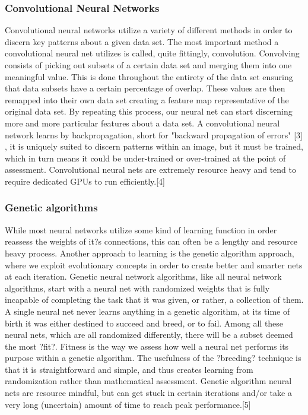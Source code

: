 \documentclass[article, onecolumn, draftclsnofoot,10pt, compsoc]{IEEEtran}
\begin{document}
\subsubsection{Convolutional Neural Networks}
Convolutional neural networks utilize a variety of different methods in order to  discern key patterns about a given data set. The most important method a convolutional neural net utilizes is called, quite fittingly, convolution. Convolving consists of picking out subsets of a certain data set and merging them into one meaningful value. This is done throughout the entirety of the data set ensuring that data subsets have a certain percentage of overlap. These values are then remapped into their own data set creating a feature map representative of the original data set. By repeating this process, our neural net can start discerning more and more particular features about a data set. A convolutional neural network learns by backpropagation, short for "backward propagation of errors" [3] , it is uniquely suited to discern patterns within an image, but it must be trained, which in turn means it could be under-trained or over-trained at the point of assessment. Convolutional neural nets are extremely resource heavy and tend to require dedicated GPUs to run efficiently.[4]

\subsubsection{Genetic algorithms}
While most neural networks utilize some kind of learning function in order reassess the weights of it?s connections, this can often be a lengthy and resource heavy process. Another approach to learning is the genetic algorithm approach, where we exploit evolutionary concepts in order to create better and smarter nets at each iteration. Genetic neural network algorithms, like all neural network algorithms, start with a neural net with randomized weights that is fully incapable of completing the task that it was given, or rather, a collection of them. A single neural net never learns anything in a genetic algorithm, at its time of birth it was either destined to succeed and breed, or to fail. Among all these neural nets, which are all randomized differently, there will be a subset deemed the most ?fit?. Fitness is the way we assess how well a neural net performs its purpose within a genetic algorithm. The usefulness of the ?breeding? technique is that it is straightforward and simple, and thus creates learning from randomization rather than mathematical assessment. Genetic algorithm neural nets are resource mindful, but can get stuck in certain iterations and/or take a very long (uncertain) amount of time to reach peak performance.[5]
 
\end{document}
